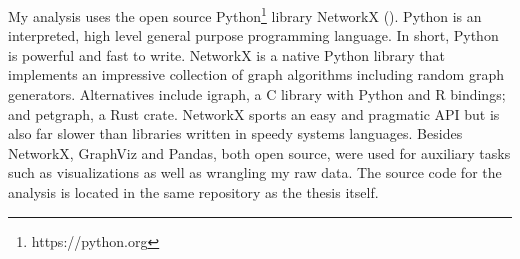 \documentclass[12pt, a4paper]{article}
\begin{document}
My analysis uses the open source Python\footnote{https://python.org} library NetworkX (\cite{networkx}). Python is an interpreted, high level general purpose programming language. In short, Python is powerful and fast to write. NetworkX is a native Python library that implements an impressive collection of graph algorithms including random graph generators. Alternatives include igraph, a C library with Python and R bindings; and petgraph, a Rust crate. NetworkX sports an easy and pragmatic API but is also far slower than libraries written in speedy systems languages. Besides NetworkX, GraphViz and Pandas, both open source, were used for auxiliary tasks such as visualizations as well as wrangling my raw data. The source code for the analysis is located in the same repository as the thesis itself.

\printbibliography
\end{document}
